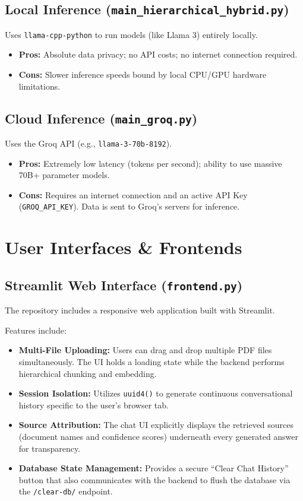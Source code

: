 \documentclass[11pt, a4paper]{article}
\begin{document}
\subsection{Local Inference (\texttt{main\_hierarchical\_hybrid.py})}
Uses \texttt{llama-cpp-python} to run models (like Llama 3) entirely locally.
\begin{itemize}
    \item \textbf{Pros:} Absolute data privacy; no API costs; no internet connection required.
    \item \textbf{Cons:} Slower inference speeds bound by local CPU/GPU hardware limitations.
\end{itemize}

\subsection{Cloud Inference (\texttt{main\_groq.py})}
Uses the Groq API (e.g., \texttt{llama-3-70b-8192}).
\begin{itemize}
    \item \textbf{Pros:} Extremely low latency (tokens per second); ability to use massive 70B+ parameter models.
    \item \textbf{Cons:} Requires an internet connection and an active API Key (\texttt{GROQ\_API\_KEY}). Data is sent to Groq's servers for inference.
\end{itemize}

\section{User Interfaces \& Frontends}

\subsection{Streamlit Web Interface (\texttt{frontend.py})}
The repository includes a responsive web application built with Streamlit.

Features include:
\begin{itemize}
    \item \textbf{Multi-File Uploading:} Users can drag and drop multiple PDF files simultaneously. The UI holds a loading state while the backend performs hierarchical chunking and embedding.
    \item \textbf{Session Isolation:} Utilizes \texttt{uuid4()} to generate continuous conversational history specific to the user's browser tab.
    \item \textbf{Source Attribution:} The chat UI explicitly displays the retrieved sources (document names and confidence scores) underneath every generated answer for transparency.
    \item \textbf{Database State Management:} Provides a secure ``Clear Chat History'' button that also communicates with the backend to flush the database via the \texttt{/clear-db/} endpoint.
\end{itemize}
\end{document}
